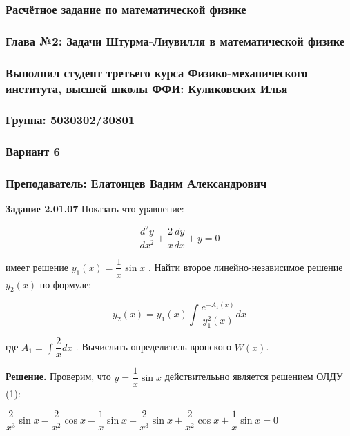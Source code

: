 \documentclass[a4paper, 12pt]{article}
\begin{document}
	\begin{center}
		\subsubsection*{Расчётное задание по математической физике}
		\subsubsection*{Глава №2: Задачи Штурма-Лиувилля  в  математической  физике}
		\subsubsection*{Выполнил студент третьего курса Физико-механического института, высшей школы ФФИ: Куликовских Илья}
		\subsubsection*{Группа: 5030302/30801}
		\subsubsection*{Вариант 6}
		\subsubsection*{Преподаватель: Елатонцев Вадим Александрович}
	\end{center}
	
	\quad \textbf{Задание 2.01.07} Показать что уравнение:
	
	\begin{equation}
		\dfrac{d^2 y}{dx^2} + \dfrac{2}{x} \dfrac{dy}{dx} + y = 0
	\end{equation}
	
	имеет решение $y_1(x) = \dfrac{1}{x} \sin x$ . Найти второе линейно-независимое решение $y_2 (x)$ по формуле:
	
	\begin{equation}
		y_2 (x) = y_1 (x) \displaystyle\int\dfrac{e^{-A_1 (x)}}{y_1^2 (x)} dx 
	\end{equation}
	
	\quad где $A_1 = \displaystyle\int \dfrac{2}{x} dx$ .  Вычислить определитель вронского $W(x)$.
	
	\quad \textbf{Решение.} Проверим, что $y = \dfrac{1}{x}\sin x$ действителььно является решением ОЛДУ (1):
	
	\begin{center}
		$\dfrac{2}{x^3}\sin x -\dfrac{2}{x^2}\cos x - \dfrac{1}{x}\sin x - \dfrac{2}{x^3}\sin x + \dfrac{2}{x^2}\cos x + \dfrac{1}{x}\sin x = 0 $ 
	\end{center}
	
\end{document}
